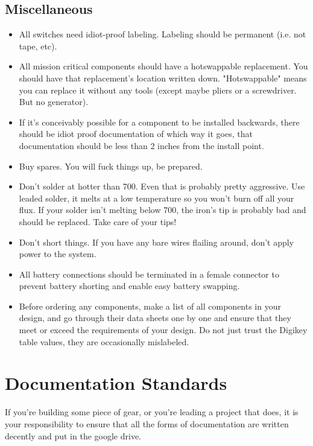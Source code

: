 \documentclass{article}
\begin{document}
\subsection{Miscellaneous}
\begin{itemize}
\item All switches need idiot-proof labeling. Labeling should be permanent (i.e. not tape, etc).
\item All mission critical components should have a hotswappable replacement. You should have that replacement's location written down. "Hotswappable" means you can replace it without any tools (except maybe pliers or a screwdriver. But no generator).
\item If it's conceivably possible for a component to be installed backwards, there should be idiot proof documentation of which way it goes, that documentation should be less than 2 inches from the install point.
\item Buy spares. You will fuck things up, be prepared.
\item Don't solder at hotter than 700\degree. Even that is probably pretty aggressive. Use leaded solder, it melts at a low temperature so you won't burn off all your flux. If your solder isn't melting below 700\degree, the iron's tip is probably bad and should be replaced. Take care of your tips!
\item Don't short things. If you have any bare wires flailing around, don't apply power to the system.
\item All battery connections should be terminated in a female connector to prevent battery shorting and enable easy battery swapping.
\item Before ordering any components, make a list of all components in your design, and go through their data sheets one by one and ensure that they meet or exceed the requirements of your design. Do not just trust the Digikey table values, they are occasionally mislabeled.
\end{itemize}

\section{Documentation Standards}
If you're building some piece of gear, or you're leading a project that does, it is your responsibility to ensure that all the forms of documentation are written decently and put in the google drive.
\end{document}
